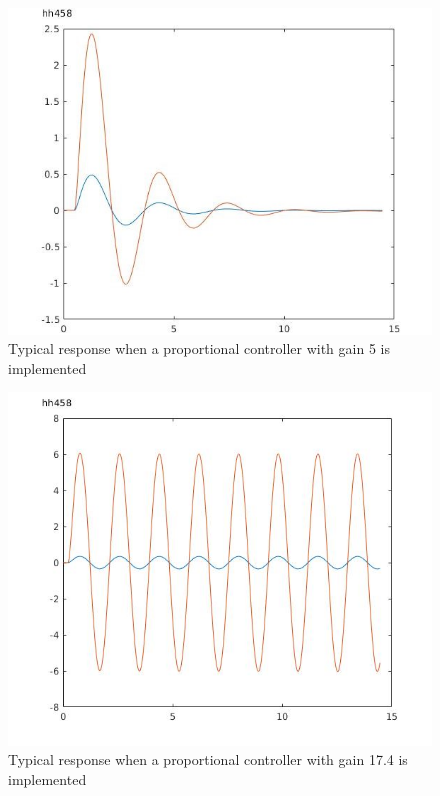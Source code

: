 \documentclass[twoside,twocolumn]{article}
\begin{document}
\begin{figure}[h]
  \centering
    \includegraphics[width=\linewidth]{3_kp=5}
  \caption{Typical response when a proportional controller with gain 5 is implemented}
  \label{fig:3kp5}
\end{figure}

\begin{figure}[h]
  \centering
    \includegraphics[width=\linewidth]{3_kp=17-4}
  \caption{Typical response when a proportional controller with gain 17.4 is implemented}
  \label{fig:3kp17-4}
\end{figure}
\end{document}
